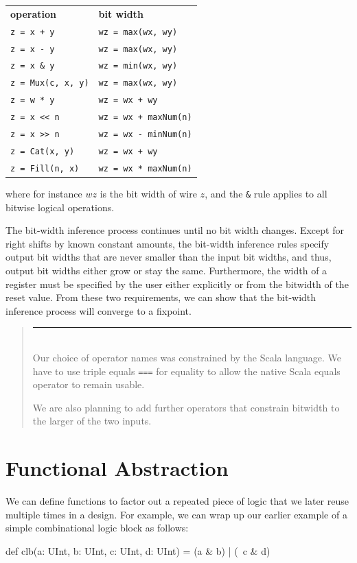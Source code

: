\documentclass[twocolumn,10pt]{article}
\newenvironment{commentary}
{ \vspace{-0.1in}
  \begin{quotation}
  \noindent
  \small \em
  \rule{\linewidth}{1pt}\\
}
{
  \end{quotation}
}
\def\code#1{{\tt #1}}
\begin{document}
\begin{tabular}{ll}
{\bf operation} & {\bf bit width} \\ 
\verb|z = x + y| & \verb|wz = max(wx, wy)| \\
\verb+z = x - y+ & \verb|wz = max(wx, wy)|\\
\verb+z = x & y+ & \verb+wz = min(wx, wy)+ \\
\verb+z = Mux(c, x, y)+ & \verb+wz = max(wx, wy)+ \\
\verb+z = w * y+ & \verb!wz = wx + wy! \\
\verb+z = x << n+ & \verb!wz = wx + maxNum(n)! \\
\verb+z = x >> n+ & \verb+wz = wx - minNum(n)+ \\
\verb+z = Cat(x, y)+ & \verb!wz = wx + wy! \\
\verb+z = Fill(n, x)+ & \verb+wz = wx * maxNum(n)+ \\
\end{tabular}

\noindent
where for instance $wz$ is the bit width of wire $z$, and the \verb+&+
rule applies to all bitwise logical operations.

The bit-width inference process continues until no bit width changes.
Except for right shifts by known constant amounts, the bit-width
inference rules specify output bit widths that are never smaller than
the input bit widths, and thus, output bit widths either grow or stay
the same.  Furthermore, the width of a register must be specified by
the user either explicitly or from the bitwidth of the reset value.
From these two requirements, we can show that the bit-width inference
process will converge to a fixpoint.

\begin{commentary}
Our choice of operator names was constrained by the Scala language.
We have to use triple equals \code{===} for equality to allow the
native Scala equals operator to remain usable.

We are also planning to add further operators that constrain bitwidth
to the larger of the two inputs.
\end{commentary}

\section{Functional Abstraction}

We can define functions to factor out a repeated piece of logic that
we later reuse multiple times in a design.  For example, we can wrap
up our earlier example of a simple combinational logic block as
follows:
\begin{scala}
def clb(a: UInt, b: UInt, c: UInt, d: UInt) = 
  (a & b) | (~c & d)
\end{scala}
\end{document}
